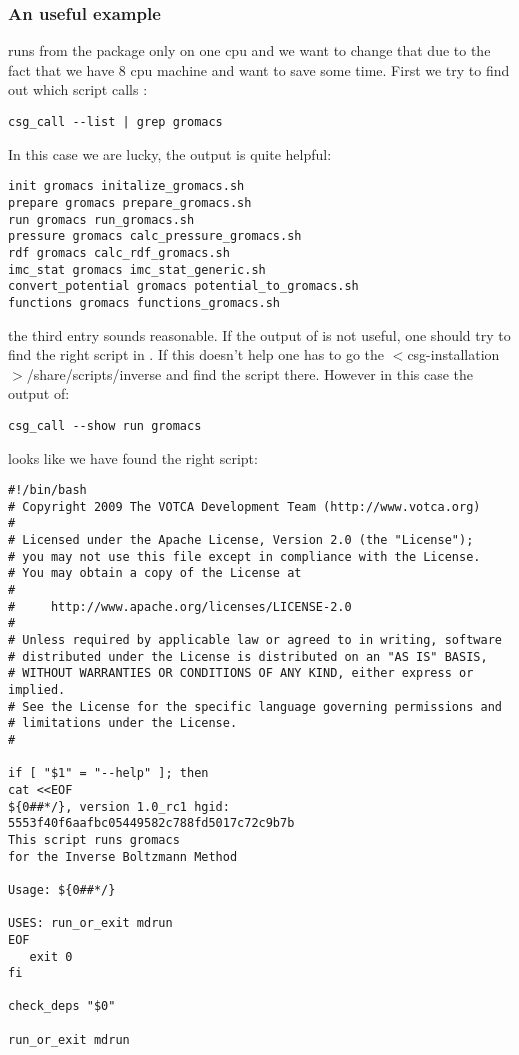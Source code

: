 \subsubsection{An useful example}
 runs  from the \gromacs package only on one cpu and we want to change that due to the fact that we have 8 cpu machine and want to save some time.
First we try to find out which script calls :
\begin{verbatim}
csg_call --list | grep gromacs
\end{verbatim}
In this case we are lucky, the output is quite helpful:
\begin{verbatim}
init gromacs initalize_gromacs.sh
prepare gromacs prepare_gromacs.sh
run gromacs run_gromacs.sh
pressure gromacs calc_pressure_gromacs.sh
rdf gromacs calc_rdf_gromacs.sh
imc_stat gromacs imc_stat_generic.sh
convert_potential gromacs potential_to_gromacs.sh
functions gromacs functions_gromacs.sh
\end{verbatim}
the third entry sounds reasonable. If the output of  is not useful, one should try to find the right script in . If this doesn't help one has to go the $<$csg-installation$>$/share/scripts/inverse and find the script there. However in this case the output of:
\begin{verbatim}
csg_call --show run gromacs
\end{verbatim}
looks like we have found the right script:
\begin{verbatim}
#!/bin/bash
# Copyright 2009 The VOTCA Development Team (http://www.votca.org)
#
# Licensed under the Apache License, Version 2.0 (the "License");
# you may not use this file except in compliance with the License.
# You may obtain a copy of the License at
#
#     http://www.apache.org/licenses/LICENSE-2.0
#
# Unless required by applicable law or agreed to in writing, software
# distributed under the License is distributed on an "AS IS" BASIS,
# WITHOUT WARRANTIES OR CONDITIONS OF ANY KIND, either express or implied.
# See the License for the specific language governing permissions and
# limitations under the License.
#

if [ "$1" = "--help" ]; then
cat <<EOF
${0##*/}, version 1.0_rc1 hgid: 5553f40f6aafbc05449582c788fd5017c72c9b7b
This script runs gromacs
for the Inverse Boltzmann Method

Usage: ${0##*/}

USES: run_or_exit mdrun
EOF
   exit 0
fi

check_deps "$0"

run_or_exit mdrun
\end{verbatim}
